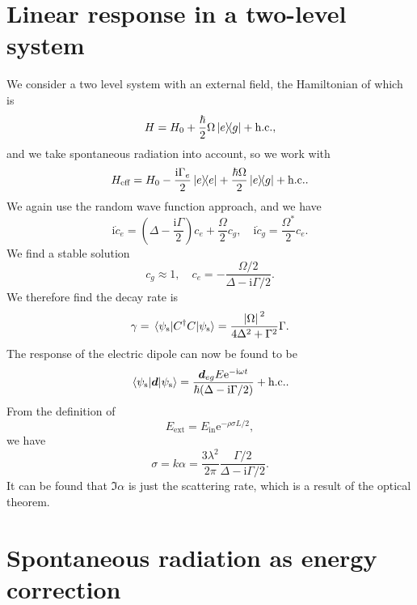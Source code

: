 \documentclass[hyperref, a4paper]{article}
\newcommand*{\ii}{\mathrm{i}}
\newcommand*{\ee}{\mathrm{e}}
\begin{document}
\section{Linear response in a two-level system}

We consider a two level system with an external field, the Hamiltonian of which is  
\begin{equation}
    H = H_0 + \frac{\hbar}{2} \Omega \dyad{e}{g} + \text{h.c.},
\end{equation}
and we take spontaneous radiation into account, so we work with 
\begin{equation}
    H_\text{eff} = H_0 - \frac{\ii \Gamma_e}{2} \dyad{e} + \frac{\hbar \Omega}{2} \dyad{e}{g} + \text{h.c.}.
\end{equation} 
We again use the random wave function approach, and we have 
\begin{equation}
    \ii \dot{c}_e = \left( \Delta - \frac{\ii \Gamma}{2} \right) c_e + \frac{\Omega}{2} c_g, \quad
    \ii \dot{c}_g = \frac{\Omega^*}{2} c_e.
\end{equation}
We find a stable solution 
\begin{equation}
    c_g \approx 1, \quad c_e = - \frac{\Omega / 2}{\Delta - \ii \Gamma / 2}.
\end{equation}
We therefore find the decay rate is  
\begin{equation}
    \gamma = \mel*{\psi_\text{s}}{C^\dagger C}{\psi_\text{s}} = \frac{\abs*{\Omega}^2}{4 \Delta^2 + \Gamma^2} \Gamma.
\end{equation}
The response of the electric dipole can now be found to be 
\begin{equation}
    \expval*{\vb*{d}}{\psi_\text{s}} = \frac{\vb*{d}_{eg} E \ee^{- \ii \omega t}}{\hbar (\Delta - \ii \Gamma /2)} + \text{h.c.}.
\end{equation}
From the definition of 
\begin{equation}
    E_\text{ext} = E_\text{in} \ee^{- \rho \sigma L / 2},
\end{equation}
we have 
\begin{equation}
    \sigma = k \alpha = \frac{3 \lambda^2}{2 \pi} \frac{\Gamma / 2}{\Delta - \ii \Gamma / 2}.
\end{equation}
It can be found that $\Im \alpha$ is just the scattering rate, which is a result of the optical theorem.

\section{Spontaneous radiation as energy correction}
\end{document}
